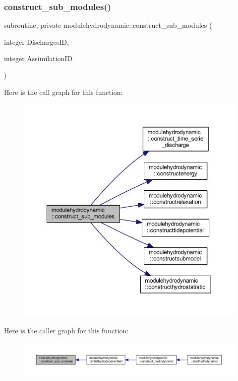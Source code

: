 \subsubsection{\texorpdfstring{construct\+\_\+sub\+\_\+modules()}{construct\_sub\_modules()}}
{\footnotesize\ttfamily subroutine, private modulehydrodynamic\+::construct\+\_\+sub\+\_\+modules (\begin{DoxyParamCaption}\item[{integer}]{Discharges\+ID,  }\item[{integer}]{Assimilation\+ID }\end{DoxyParamCaption})\hspace{0.3cm}{\ttfamily [private]}}

Here is the call graph for this function\+:\nopagebreak
\begin{figure}[H]
\begin{center}
\leavevmode
\includegraphics[width=350pt]{namespacemodulehydrodynamic_acaa5f838138b21f2c4d3c245177ae6bf_cgraph}
\end{center}
\end{figure}
Here is the caller graph for this function\+:\nopagebreak
\begin{figure}[H]
\begin{center}
\leavevmode
\includegraphics[width=350pt]{namespacemodulehydrodynamic_acaa5f838138b21f2c4d3c245177ae6bf_icgraph}
\end{center}
\end{figure}
\mbox{\label{namespacemodulehydrodynamic_a50ddc8a159376915f9ee9328f388d4fe}} 
